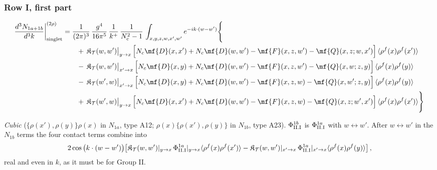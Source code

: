 {\subsubsection*{Row I, first part}

\begin{align}
\frac{d^{3}N_{1a+1b}}{d^{3}k}\bigg|^{(2\rho)}_{\rm singlet}&=\frac{1}{(2\pi)^{3}}\,\frac{g^{4}}{16\pi^{5}}\,\frac{1}{k^{+}}\,\frac{1}{N_{c}^{2}-1}\,\int_{x,y,z,w,x',w'}e^{-ik\cdot(w-w')}\Bigg\{\notag\\
&\qquad +\,\mathfrak{K}_{\mathcal{T}}(w,w')\big|_{y\to x}\,\Big[N_{c}\mf{D}(x,x')+N_{c}\mf{D}(w,w')-\mf{F}(x,z,w')-\mf{Q}(x,z;w,x')\Big]\,\langle\rho^{f}(x)\rho^{f}(x')\rangle\notag\\
&\qquad -\,\mathfrak{K}_{\mathcal{T}}(w,w')\big|_{x'\to x}\,\Big[N_{c}\mf{D}(x,y)+N_{c}\mf{D}(w,w')-\mf{F}(x,z,w')-\mf{Q}(x,w;z,y)\Big]\,\langle\rho^{f}(x)\rho^{f}(y)\rangle\notag\\
&\qquad -\,\mathfrak{K}_{\mathcal{T}}(w',w)\big|_{x'\to x}\,\Big[N_{c}\mf{D}(x,y)+N_{c}\mf{D}(w,w')-\mf{F}(x,z,w)-\mf{Q}(x,w';z,y)\Big]\,\langle\rho^{f}(x)\rho^{f}(y)\rangle\notag\\
&\qquad +\,\mathfrak{K}_{\mathcal{T}}(w',w)\big|_{y\to x}\,\Big[N_{c}\mf{D}(x,x')+N_{c}\mf{D}(w,w')-\mf{F}(x,z,w)-\mf{Q}(x,z;w',x')\Big]\,\langle\rho^{f}(x)\rho^{f}(x')\rangle\Bigg\}\label{eq:s-II-I-1}
\end{align}

\emph{Cubic} ($\{\rho(x'),\rho(y)\}\rho(x)$ in $N_{1a}$, type A12; $\rho(x)\{\rho(x'),\rho(y)\}$ in $N_{1b}$, type A23). $\Phi^{1b}_{\rm II.I}$ is $\Phi^{1a}_{\rm II.I}$ with $w\leftrightarrow w'$. After $w\leftrightarrow w'$ in the $N_{1b}$ terms the four contact terms combine into
\begin{align}
2\cos\big(k\cdot(w-w')\big)\big[\mathfrak{K}_{\mathcal{T}}(w,w')|_{y\to x}\,\Phi^{1a}_{\rm II.I}|_{y\to x}\langle\rho^{f}(x)\rho^{f}(x')\rangle-\mathfrak{K}_{\mathcal{T}}(w,w')|_{x'\to x}\,\Phi^{1a}_{\rm II.I}|_{x'\to x}\langle\rho^{f}(x)\rho^{f}(y)\rangle\big]\,,\notag
\end{align}
real and even in $k$, as it must be for Group II.

}
